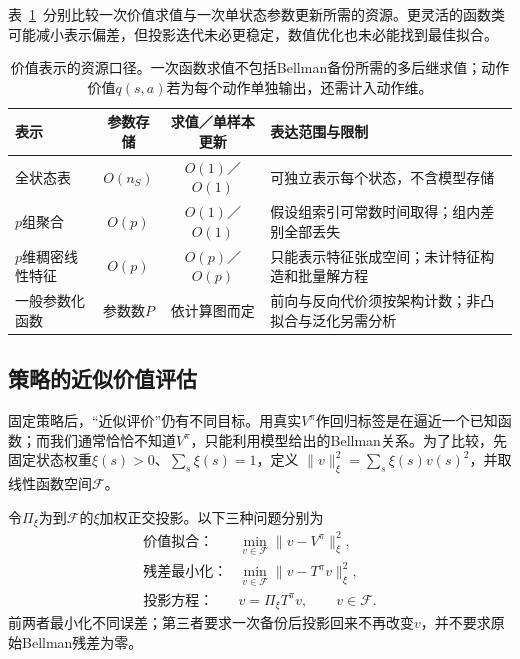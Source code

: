 表~\ref{tab:rl-planning-representations}~分别比较一次价值求值与一次单状态参数更新所需的资源。更灵活的函数类可能减小表示偏差，但投影迭代未必更稳定，数值优化也未必能找到最佳拟合。

\begin{table}[htbp]
 \centering
 \small
 \begin{tabularx}{\linewidth}{@{}lcc>{\raggedright\arraybackslash}X@{}}
  \toprule
  表示 & 参数存储 & 求值／单样本更新 & 表达范围与限制\\
  \midrule
  全状态表 & $O(n_S)$ & $O(1)$／$O(1)$ & 可独立表示每个状态，不含模型存储\\
  $p$组聚合 & $O(p)$ & $O(1)$／$O(1)$ & 假设组索引可常数时间取得；组内差别全部丢失\\
  $p$维稠密线性特征 & $O(p)$ & $O(p)$／$O(p)$ & 只能表示特征张成空间；未计特征构造和批量解方程\\
  一般参数化函数 & 参数数$P$ & 依计算图而定 & 前向与反向代价须按架构计数；非凸拟合与泛化另需分析\\
  \bottomrule
 \end{tabularx}
 \caption{价值表示的资源口径。一次函数求值不包括Bellman备份所需的多后继求值；动作价值$q(s,a)$若为每个动作单独输出，还需计入动作维。}
 \label{tab:rl-planning-representations}
\end{table}

\subsection{策略的近似价值评估}
\label{sec:rl-planning-approximate-evaluation}

固定策略后，“近似评价”仍有不同目标。用真实$V^\pi$作回归标签是在逼近一个已知函数；而我们通常恰恰不知道$V^\pi$，只能利用模型给出的Bellman关系。为了比较，先固定状态权重$\xi(s)>0$、$\sum_s\xi(s)=1$，定义
$\lVert v\rVert_\xi^2=\sum_s\xi(s)v(s)^2$，并取线性函数空间$\mathcal F$。

\begin{definition}[三种近似评价对象]
 \label{def:rl-planning-projected-evaluation}
 令$\Pi_\xi$为到$\mathcal F$的$\xi$加权正交投影。以下三种问题分别为
 \[
 \begin{array}{ll}
 \text{价值拟合：}&\displaystyle\min_{v\in\mathcal F}\lVert v-V^\pi\rVert_\xi^2,\\
 \text{残差最小化：}&\displaystyle\min_{v\in\mathcal F}\lVert v-T^\pi v\rVert_\xi^2,\\
 \text{投影方程：}&v=\Pi_\xi T^\pi v,\qquad v\in\mathcal F.
 \end{array}
 \]
 前两者最小化不同误差；第三者要求一次备份后投影回来不再改变$v$，并不要求原始Bellman残差为零。
\end{definition}

